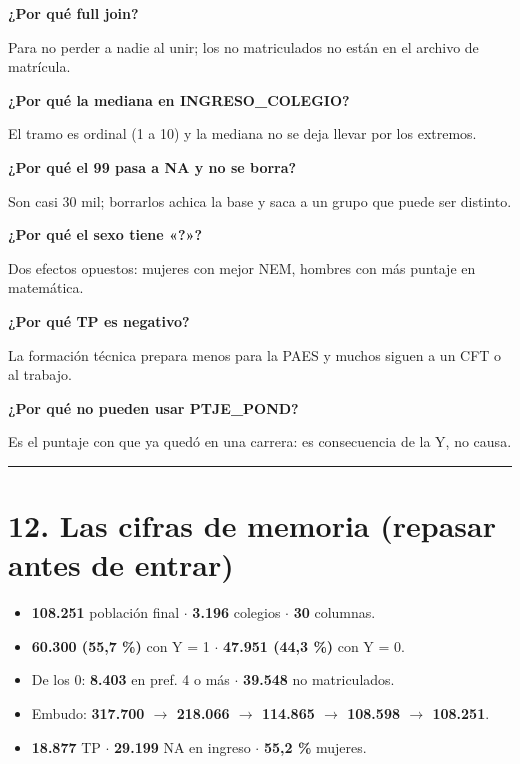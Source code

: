 \documentclass[11pt]{article}
\begin{document}
\textbf{¿Por qué full join?}\par
\begin{guion}Para no perder a nadie al unir; los no matriculados no están en el archivo de matrícula.\end{guion}

\textbf{¿Por qué la mediana en INGRESO\_COLEGIO?}\par
\begin{guion}El tramo es ordinal (1 a 10) y la mediana no se deja llevar por los extremos.\end{guion}

\textbf{¿Por qué el 99 pasa a NA y no se borra?}\par
\begin{guion}Son casi 30 mil; borrarlos achica la base y saca a un grupo que puede ser distinto.\end{guion}

\textbf{¿Por qué el sexo tiene «?»?}\par
\begin{guion}Dos efectos opuestos: mujeres con mejor NEM, hombres con más puntaje en matemática.\end{guion}

\textbf{¿Por qué TP es negativo?}\par
\begin{guion}La formación técnica prepara menos para la PAES y muchos siguen a un CFT o al trabajo.\end{guion}

\textbf{¿Por qué no pueden usar PTJE\_POND?}\par
\begin{guion}Es el puntaje con que ya quedó en una carrera: es consecuencia de la Y, no causa.\end{guion}

\medskip\hrule\medskip

\section*{12. Las cifras de memoria (repasar antes de entrar)}

\begin{itemize}
\item \textbf{108.251} población final $\cdot$ \textbf{3.196} colegios $\cdot$ \textbf{30} columnas.
\item \textbf{60.300 (55,7 \%)} con Y = 1 $\cdot$ \textbf{47.951 (44,3 \%)} con Y = 0.
\item De los 0: \textbf{8.403} en pref. 4 o más $\cdot$ \textbf{39.548} no matriculados.
\item Embudo: \textbf{317.700 $\rightarrow$ 218.066 $\rightarrow$ 114.865 $\rightarrow$ 108.598 $\rightarrow$ 108.251}.
\item \textbf{18.877} TP $\cdot$ \textbf{29.199} NA en ingreso $\cdot$ \textbf{55,2 \%} mujeres.
\end{itemize}
\end{document}
